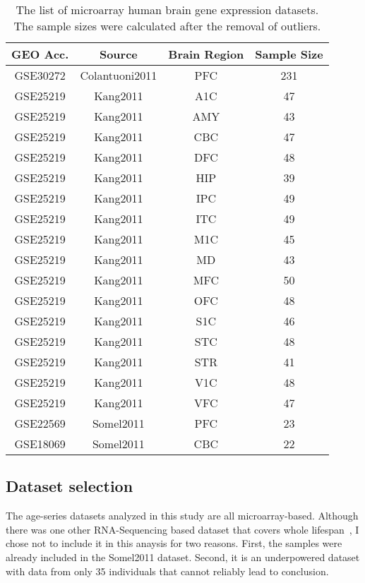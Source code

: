 \begin{table}[ht]
\centering
\caption{The list of microarray human brain gene expression datasets. The sample sizes were calculated after the removal of outliers.}\label{table:table1}
\begin{tabular}{|c c c c|}
 \hline
 \textbf{GEO Acc.} & \textbf{Source} & \textbf{Brain Region} & \textbf{Sample Size} \\ [0.5ex] 
 \hline\hline
 GSE30272 & Colantuoni2011 & PFC & 231 \\ 
 \hline
 GSE25219 & Kang2011 & A1C & 47 \\
 \hline
 GSE25219 & Kang2011 & AMY & 43 \\
 \hline
 GSE25219 & Kang2011 & CBC & 47 \\
 \hline
 GSE25219 & Kang2011 & DFC & 48 \\
 \hline
 GSE25219 & Kang2011 & HIP & 39 \\
 \hline
 GSE25219 & Kang2011 & IPC & 49 \\
 \hline
 GSE25219 & Kang2011 & ITC & 49 \\
 \hline
 GSE25219 & Kang2011 & M1C & 45 \\
 \hline
 GSE25219 & Kang2011 & MD & 43 \\
 \hline
 GSE25219 & Kang2011 & MFC & 50 \\
 \hline
 GSE25219 & Kang2011 & OFC & 48 \\
 \hline
 GSE25219 & Kang2011 & S1C & 46 \\
 \hline
 GSE25219 & Kang2011 & STC & 48 \\
 \hline
 GSE25219 & Kang2011 & STR & 41 \\
 \hline
 GSE25219 & Kang2011 & V1C & 48 \\
 \hline
 GSE25219 & Kang2011 & VFC & 47 \\
 \hline
 GSE22569 & Somel2011 & PFC & 23 \\
 \hline
 GSE18069 & Somel2011 & CBC & 22 \\
\hline
\end{tabular}
\end{table}

\subsection{Dataset selection}
The age-series datasets analyzed in this study are all microarray-based. 
Although there was one other RNA-Sequencing based dataset that covers whole lifespan~\cite{Mazin2013}, I chose not to include it in this anaysis for two reasons.
First, the samples were already included in the Somel2011 dataset. 
Second, it is an underpowered dataset with data from only 35 individuals that cannot reliably lead to conclusion.

